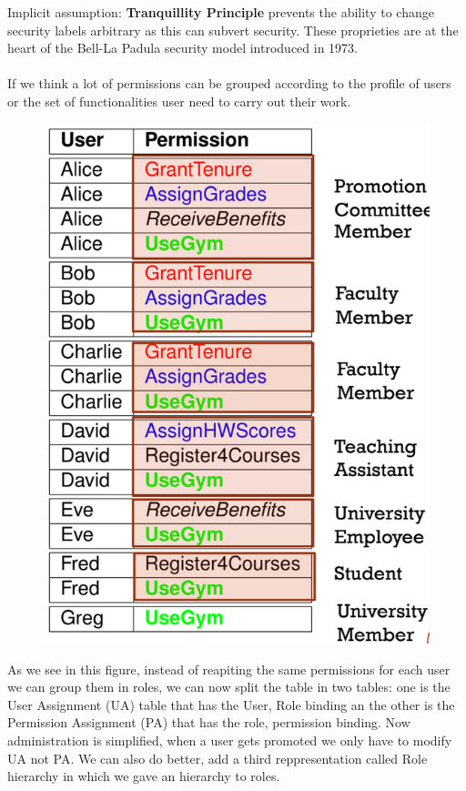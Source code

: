 Implicit assumption: \textbf{Tranquillity Principle} prevents the ability to change security labels arbitrary as this can subvert security. These proprieties are at the heart of the Bell-La Padula security model introduced in 1973.
\\\\ 
If we think a lot of permissions can be grouped according to the profile of users or the set of functionalities user need to carry out their work.
\begin{figure}[h!]
    \centering
    \includegraphics[scale=0.4]{images/acevolution.png}
\end{figure}
\FloatBarrier
As we see in this figure, instead of reapiting the same permissions for each user we can group them in roles, we can now split the table in two tables: one is the User Assignment (UA) table that has the User, Role binding an the other is the Permission Assignment (PA) that has the role, permission binding. Now administration is simplified, when a user gets promoted we only have to modify UA not PA. We can also do better, add a third reppresentation called Role hierarchy in which we gave an hierarchy to roles.

